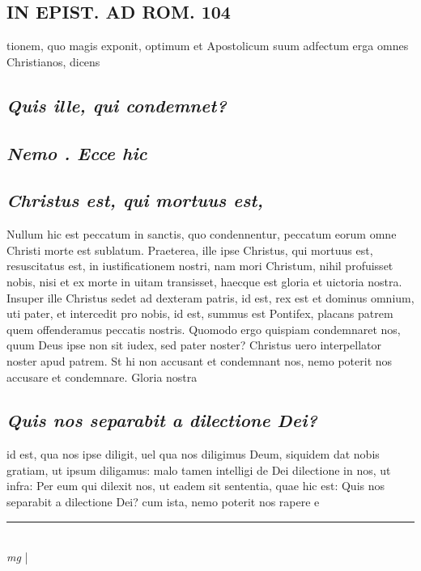 \documentclass{article}
\begin{document}
\begin{pages}
\section*{IN EPIST. AD ROM.  104 }
\marginpar{[ p.]}\pstart tionem, quo magis exponit, optimum et Apostolicum suum adfectum erga omnes Christianos, dicens\pend
{}
{}
\subsection*{\textit{Quis ille, qui condemnet? }}
{}
\subsection*{\textit{Nemo . Ecce hic }}
{}
\subsection*{\textit{Christus est, qui mortuus est, }}\pstart Nullum hic est peccatum in sanctis, quo condennentur, peccatum eorum omne Christi morte est sublatum. Praeterea, ille ipse Christus, qui mortuus est, resuscitatus est, in iustificationem nostri, nam mori Christum, nihil profuisset nobis, nisi et ex morte in uitam transisset, haecque est gloria et uictoria nostra. Insuper ille Christus sedet ad dexteram patris, id est, rex est et dominus omnium, uti pater, et intercedit pro nobis, id est, summus est Pontifex, placans patrem quem offenderamus peccatis nostris. Quomodo ergo quispiam condemnaret nos, quum Deus ipse non sit iudex, sed pater noster? Christus uero interpellator noster apud patrem. St hi non accusant et condemnant nos, nemo poterit nos accusare et condemnare.  Gloria nostra  \pend
{}
{}
\subsection*{\textit{Quis nos separabit a dilectione Dei? }}\pstart id est, qua nos ipse diligit, uel qua nos diligimus Deum, siquidem dat nobis gratiam, ut ipsum diligamus: malo tamen intelligi de Dei dilectione in nos, ut infra: Per eum qui dilexit nos, ut eadem sit sententia, quae hic est: Quis nos separabit a dilectione Dei? cum ista, nemo poterit nos rapere e  \pend
\vspace{0.5cm}\noindent
\vspace{0.2cm}\rule{1cm}{0.2pt}\\ 
\hspace{0.2cm}\textit{mg}
\footnotesize 
\normalsize| 

\end{pages}
\end{document}
